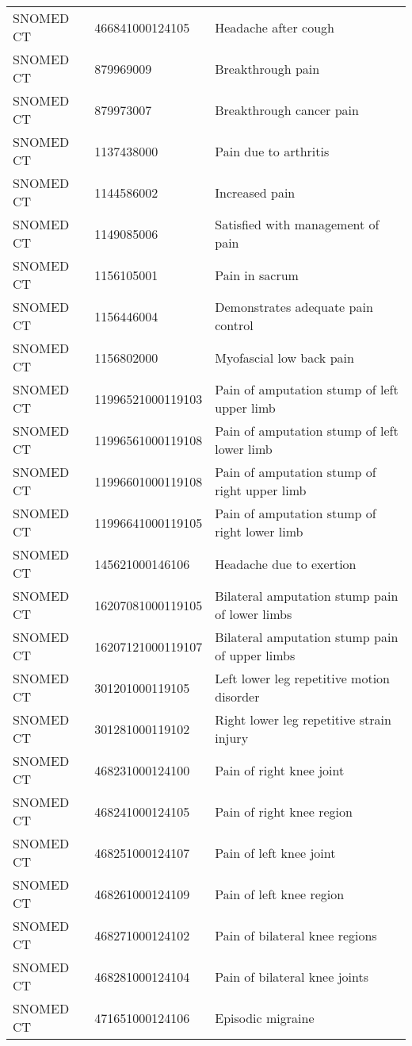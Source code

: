 \begin{longtable}{p{}p{}p{}}
  SNOMED CT & 466841000124105 & Headache after cough \\ 
  SNOMED CT & 879969009 & Breakthrough pain \\ 
  SNOMED CT & 879973007 & Breakthrough cancer pain \\ 
  SNOMED CT & 1137438000 & Pain due to arthritis \\ 
  SNOMED CT & 1144586002 & Increased pain \\ 
  SNOMED CT & 1149085006 & Satisfied with management of pain \\ 
  SNOMED CT & 1156105001 & Pain in sacrum \\ 
  SNOMED CT & 1156446004 & Demonstrates adequate pain control \\ 
  SNOMED CT & 1156802000 & Myofascial low back pain \\ 
  SNOMED CT & 11996521000119103 & Pain of amputation stump of left upper limb \\ 
  SNOMED CT & 11996561000119108 & Pain of amputation stump of left lower limb \\ 
  SNOMED CT & 11996601000119108 & Pain of amputation stump of right upper limb \\ 
  SNOMED CT & 11996641000119105 & Pain of amputation stump of right lower limb \\ 
  SNOMED CT & 145621000146106 & Headache due to exertion \\ 
  SNOMED CT & 16207081000119105 & Bilateral amputation stump pain of lower limbs \\ 
  SNOMED CT & 16207121000119107 & Bilateral amputation stump pain of upper limbs \\ 
  SNOMED CT & 301201000119105 & Left lower leg repetitive motion disorder \\ 
  SNOMED CT & 301281000119102 & Right lower leg repetitive strain injury \\ 
  SNOMED CT & 468231000124100 & Pain of right knee joint \\ 
  SNOMED CT & 468241000124105 & Pain of right knee region \\ 
  SNOMED CT & 468251000124107 & Pain of left knee joint \\ 
  SNOMED CT & 468261000124109 & Pain of left knee region \\ 
  SNOMED CT & 468271000124102 & Pain of bilateral knee regions \\ 
  SNOMED CT & 468281000124104 & Pain of bilateral knee joints \\ 
  SNOMED CT & 471651000124106 & Episodic migraine \\ 

\end{longtable}
